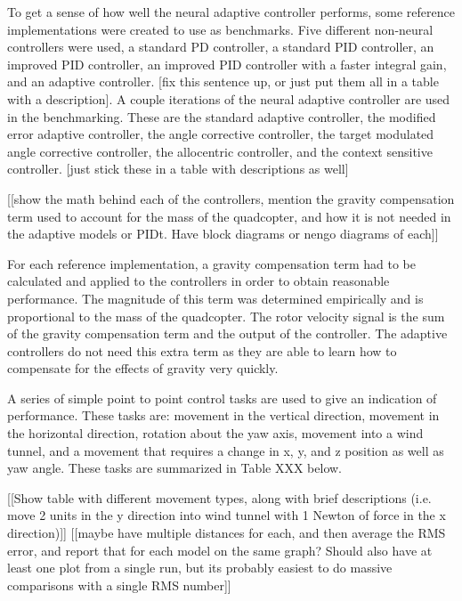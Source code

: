 \documentclass[letterpaper,12pt,titlepage,oneside,final]{book}
\begin{document}

To get a sense of how well the neural adaptive controller performs, some reference implementations were created to use as benchmarks. Five different non-neural controllers were used, a standard PD controller, a standard PID controller, an improved PID controller, an improved PID controller with a faster integral gain, and an adaptive controller. [fix this sentence up, or just put them all in a table with a description]. A couple iterations of the neural adaptive controller are used in the benchmarking. These are the standard adaptive controller, the modified error adaptive controller, the angle corrective controller, the target modulated angle corrective controller, the allocentric controller, and the context sensitive controller. [just stick these in a table with descriptions as well]

[[show the math behind each of the controllers, mention the gravity compensation term used to account for the mass of the quadcopter, and how it is not needed in the adaptive models or PIDt. Have block diagrams or nengo diagrams of each]]

For each reference implementation, a gravity compensation term had to be calculated and applied to the controllers in order to obtain reasonable performance. The magnitude of this term was determined empirically and is proportional to the mass of the quadcopter. The rotor velocity signal is the sum of the gravity compensation term and the output of the controller. The adaptive controllers do not need this extra term as they are able to learn how to compensate for the effects of gravity very quickly.

A series of simple point to point control tasks are used to give an indication of performance. These tasks are: movement in the vertical direction, movement in the horizontal direction, rotation about the yaw axis, movement into a wind tunnel, and a movement that requires a change in x, y, and z position as well as yaw angle. These tasks are summarized in Table XXX below.

[[Show table with different movement types, along with brief descriptions (i.e. move 2 units in the y direction into wind tunnel with 1 Newton of force in the x direction)]]
[[maybe have multiple distances for each, and then average the RMS error, and report that for each model on the same graph? Should also have at least one plot from a single run, but its probably easiest to do massive comparisons with a single RMS number]]
\end{document}

